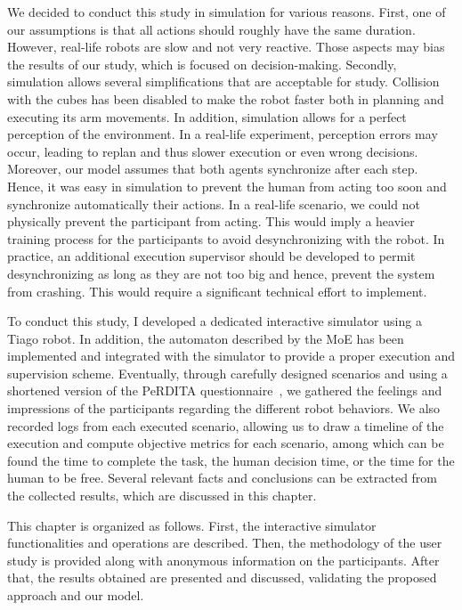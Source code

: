 We decided to conduct this study in simulation for various reasons. First, one of our assumptions is that all actions should roughly have the same duration. However, real-life robots are slow and not very reactive. Those aspects may bias the results of our study, which is focused on decision-making. Secondly, simulation allows several simplifications that are acceptable for study. Collision with the cubes has been disabled to make the robot faster both in planning and executing its arm movements. In addition, simulation allows for a perfect perception of the environment. In a real-life experiment, perception errors may occur, leading to replan and thus slower execution or even wrong decisions. Moreover, our model assumes that both agents synchronize after each step. Hence, it was easy in simulation to prevent the human from acting too soon and synchronize automatically their actions. In a real-life scenario, we could not physically prevent the participant from acting. This would imply a heavier training process for the participants to avoid desynchronizing with the robot. In practice, an additional execution supervisor should be developed to permit desynchronizing as long as they are not too big and hence, prevent the system from crashing. This would require a significant technical effort to implement.

To conduct this study, I developed a dedicated interactive simulator using a Tiago robot. In addition, the automaton described by the MoE has been implemented and integrated with the simulator to provide a proper execution and supervision scheme. Eventually, through carefully designed scenarios and using a shortened version of the PeRDITA questionnaire~\cite{devin_evaluating_2018}, we gathered the feelings and impressions of the participants regarding the different robot behaviors. We also recorded logs from each executed scenario, allowing us to draw a timeline of the execution and compute objective metrics for each scenario, among which can be found the time to complete the task, the human decision time, or the time for the human to be free. Several relevant facts and conclusions can be extracted from the collected results, which are discussed in this chapter.

This chapter is organized as follows. First, the interactive simulator functionalities and operations are described. Then, the methodology of the user study is provided along with anonymous information on the participants. After that, the results obtained are presented and discussed, validating the proposed approach and our model.

